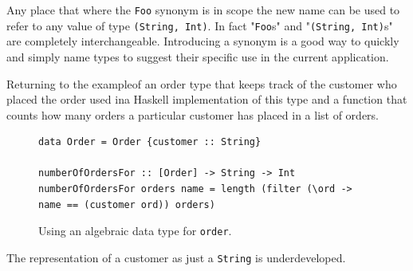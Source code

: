 Any place that where the \texttt{Foo} synonym is in scope the new name can be used to refer to any value of type \texttt{(String, Int)}. In fact "\texttt{Foo}s" and "\texttt{(String, Int)}s" are completely interchangeable. Introducing a synonym is a good way to quickly and simply name types to suggest their specific use in the current application.

Returning to the example\DIFdelbegin {}\DIFdelend \DIFaddbegin {}\DIFaddend of an order type that keeps track of the customer who placed the order used in\DIFdelbegin {}\DIFdelend \DIFaddbegin {}\DIFaddend a Haskell implementation of this type and a function that counts how many orders a particular customer has placed in a list of orders.

\begin{figure}
	\DIFdelbeginFL %

\DIFdelendFL \DIFaddbeginFL \begin{lstlisting}
data Order = Order {customer :: String}

numberOfOrdersFor :: [Order] -> String -> Int
numberOfOrdersFor orders name = length (filter (\ord -> name == (customer ord)) orders)
	\end{lstlisting}
	\DIFaddendFL \caption{Using an algebraic data type for \texttt{order}.}
	\DIFaddbeginFL \label{haskellOrder}
\DIFaddendFL \end{figure}

The \DIFdelbegin {}\DIFdelend \DIFaddbegin {}\DIFaddend representation of a customer as just a \texttt{String} is underdeveloped. \DIFaddbegin {}

